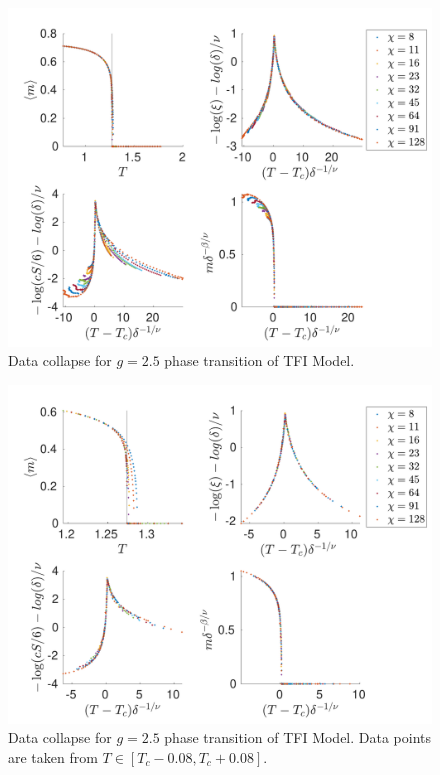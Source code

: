 \begin{figure}[!htbp]
    \center
    \includegraphics[width=\textwidth]{Figuren/phasediag/g25/Full.pdf}
    \caption{ Data collapse for $g=2.5$ phase transition of \Gls{TFI} Model. }
    \label{fig:phase:g25:full}
\end{figure}

\begin{figure}[!htbp]
    \center
    \includegraphics[width=\textwidth]{Figuren/phasediag/g25/zoomed.pdf}
    \caption{ Data collapse for $g=2.5$ phase transition of \Gls{TFI} Model. Data points are taken from $T \in \left[ T_c -0.08, T_c +0.08 \right]$. }
    \label{fig:phase:g25:zoomed}
\end{figure}

